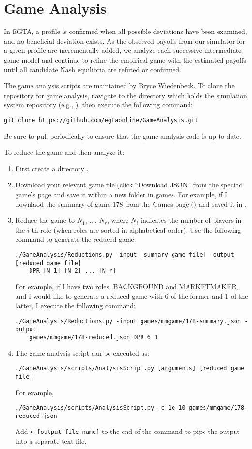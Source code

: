 \documentclass[11pt]{article}
\begin{document}
\section{Game Analysis}\label{sec:analysis}

In EGTA, a profile is confirmed when all possible deviations have been examined, and no beneficial deviation exists.
As the observed payoffs from our simulator for a given profile are incrementally added, we analyze each successive intermediate game model and continue to refine the empirical game with the estimated payoffs until all candidate Nash equilibria are refuted or confirmed.

The game analysis scripts are maintained by \href{mailto:btwied@umich.edu}{Bryce Wiedenbeck}. To clone the repository for game analysis, navigate to the directory which holds the simulation system repository (e.g., ), then execute the following command:
\begin{verbatim}
git clone https://github.com/egtaonline/GameAnalysis.git
\end{verbatim}
Be sure to pull periodically to ensure that the game analysis code is up to date.

To reduce the game and then analyze it:
\begin{enumerate}
\item First create a directory . 
\item Download your relevant game file (click ``Download JSON'' from the specific game's page and save it within a new folder in games. For example, if I downlaod the summary of game 178 from the Games page () and saved it in . 
\item Reduce the game to $N_1$, ..., $N_r$, where $N_i$ indicates the number of players in the $i$-th role (when roles are sorted in alphabetical order). Use the following command to generate the reduced game:
\begin{verbatim}
./GameAnalysis/Reductions.py -input [summary game file] -output [reduced game file] 
    DPR [N_1] [N_2] ... [N_r]
\end{verbatim}
For example, if I have two roles, BACKGROUND and MARKETMAKER, and I would like to generate a reduced game with 6 of the former and 1 of the latter, I execute the following command:
\begin{verbatim}
./GameAnalysis/Reductions.py -input games/mmgame/178-summary.json -output 
    games/mmgame/178-reduced.json DPR 6 1
\end{verbatim}

\item The game analysis script can be executed as:
\begin{verbatim}
./GameAnalysis/scripts/AnalysisScript.py [arguments] [reduced game file]
\end{verbatim}
For example,
\begin{verbatim}
./GameAnalysis/scripts/AnalysisScript.py -c 1e-10 games/mmgame/178-reduced-json
\end{verbatim}
Add \verb|> [output file name]| to the end of the command to pipe the output into a separate text file.
\end{enumerate}
\end{document}
